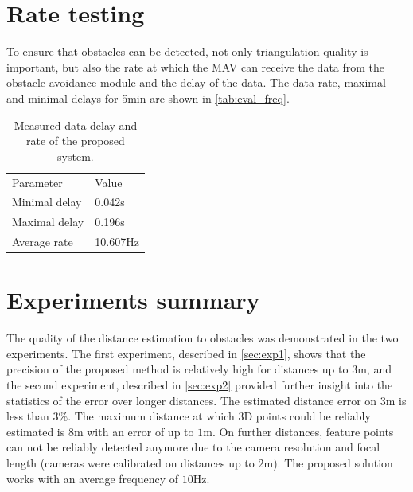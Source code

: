 \section{Rate testing}
To ensure that obstacles can be detected, not only triangulation quality is important, but also the rate at which the MAV can receive the data from the obstacle avoidance module and the delay of the data.
The data rate, maximal and minimal delays for 5min are shown in \autoref{tab:eval_freq}.
\begin{table}[ht]
    \begin{center}
      \begin{tabular}{ll}
      \hline
        Parameter & Value \\
        Minimal delay &  0.042s \\
        Maximal delay &  0.196s \\
        Average rate & 10.607Hz \\ 
      \end{tabular}
    \end{center}
    \caption{Measured data delay and rate of the proposed system.}
    \label{tab:eval_freq}
\end{table}
 
\section{Experiments summary}
The quality of the distance estimation to obstacles was demonstrated in the two experiments.
The first experiment, described in \autoref{sec:exp1}, shows that the precision of the proposed method is relatively high for distances up to 3m, and the second experiment, described in \autoref{sec:exp2} provided further insight into the statistics of the error over longer distances. 
The estimated distance error on $3$m is less than $3\%$.
The maximum distance at which 3D points could be reliably estimated is $8$m with an error of up to $1$m.
On further distances, feature points can not be reliably detected anymore due to the camera resolution and focal length (cameras were calibrated on distances up to $2$m).
The proposed solution works with an average frequency of $10$Hz.
